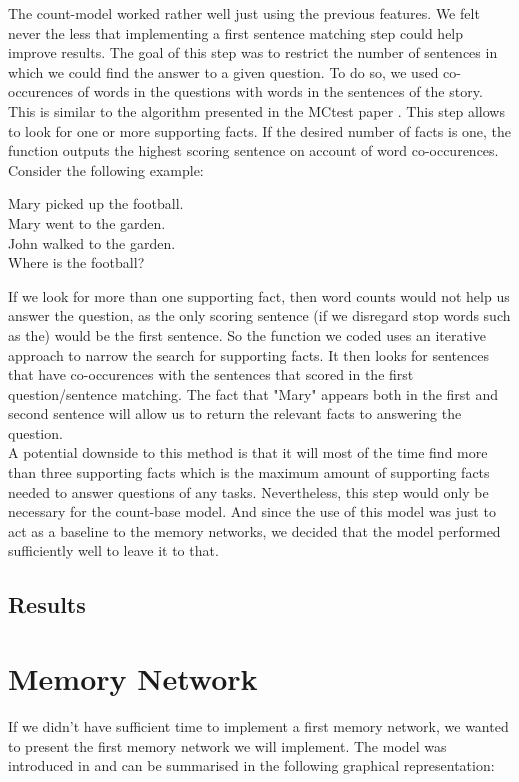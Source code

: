 \documentclass[paper=a4, fontsize=11pt]{scrartcl} %
\numberwithin{equation}{section} %
\numberwithin{figure}{section} %
\numberwithin{table}{section} %
\begin{document}
The count-model worked rather well just using the previous features. We felt never the less that implementing a first sentence matching step could help improve results. The goal of this step was to restrict the number of sentences in which we could find the answer to a given question. To do so, we used co-occurences of words in the questions with words in the sentences of the story. This is similar to the algorithm presented in the MCtest paper \cite{mct}. This step allows to look for one or more supporting facts. If the desired number of facts is one, the function outputs the highest scoring sentence on account of word co-occurences. Consider the following example:\\
\begin{center}
Mary picked up the football.\\
Mary went to the garden.\\
John walked to the garden.\\
Where is the football?
\end{center}
If we look for more than one supporting fact, then word counts would not help us answer the question, as the only scoring sentence (if we disregard stop words such as the) would be the first sentence. So the function we coded uses an iterative approach to narrow the search for supporting facts. It then looks for sentences that have co-occurences with the sentences that scored in the first question/sentence matching. The fact that "Mary" appears both in the first and second sentence will allow us to return the relevant facts to answering the question.\\

A potential downside to this method is that it will most of the time find more than three supporting facts which is the maximum amount of supporting facts needed to answer questions of any tasks. Nevertheless, this step would only be necessary for the count-base model. And since the use of this model was just to act as a baseline to the memory networks, we decided that the model performed sufficiently well to leave it to that.

\subsection{Results}
\section{Memory Network}

If we didn't have sufficient time to implement a first memory network, we wanted to present the first memory network we will implement. The model was introduced in \cite{mem} and can be summarised in the following graphical representation:
\end{document}
